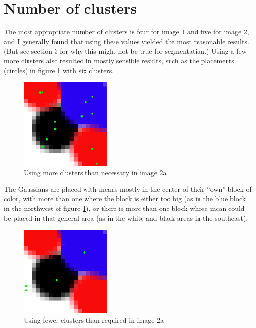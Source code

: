 \documentclass[letterpaper, 10pt, twocolumn]{article}
\numberwithin{theorem}{section}
\begin{document}
\section{Number of clusters}
The most appropriate number of clusters is four for image 1 and five for image 2, and I generally found that using these values yielded the most reasonable results. 
(But see section 3 for why this might not be true for segmentation.)
Using a few more clusters also resulted in mostly sensible results, such as the placements (circles) in figure \ref{fig:2a-6clusters} with six clusters. 

\begin{figure}[h]
	\centering
	\includegraphics[width=0.4\textwidth]{2a-6clusters}
	\caption{Using more clusters than necessary in image 2a}
	\label{fig:2a-6clusters}
\end{figure}
The Gaussians are placed with means mostly in the center of their ``own'' block of color, with more than one where the block is either too big (as in the blue block in the northwest of figure \ref{fig:2a-6clusters}), or there is more than one block whose mean could be placed in that general area (as in the white and black areas in the southeast).

\begin{figure}[h]
	\centering
	\includegraphics[width=0.4\textwidth]{2a-2clusters}
	\caption{Using fewer clusters than required in image 2a}
	\label{fig:2a-2clusters}
\end{figure}
\end{document}

